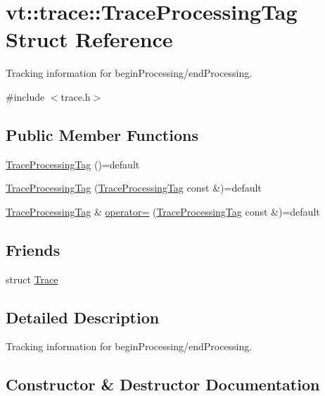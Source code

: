 \hypertarget{structvt_1_1trace_1_1_trace_processing_tag}{}\section{vt\+:\+:trace\+:\+:Trace\+Processing\+Tag Struct Reference}
\label{structvt_1_1trace_1_1_trace_processing_tag}


Tracking information for begin\+Processing/end\+Processing.  




{\ttfamily \#include $<$trace.\+h$>$}

\subsection*{Public Member Functions}
\begin{DoxyCompactItemize}
\item 
\hyperlink{structvt_1_1trace_1_1_trace_processing_tag_af06f6265d03791717242e1cec769dd84}{Trace\+Processing\+Tag} ()=default
\item 
\hyperlink{structvt_1_1trace_1_1_trace_processing_tag_a332019e755f6265ab0a74626322c590f}{Trace\+Processing\+Tag} (\hyperlink{structvt_1_1trace_1_1_trace_processing_tag}{Trace\+Processing\+Tag} const \&)=default
\item 
\hyperlink{structvt_1_1trace_1_1_trace_processing_tag}{Trace\+Processing\+Tag} \& \hyperlink{structvt_1_1trace_1_1_trace_processing_tag_a56727ddff7dce03576f3ed117235b327}{operator=} (\hyperlink{structvt_1_1trace_1_1_trace_processing_tag}{Trace\+Processing\+Tag} const \&)=default
\end{DoxyCompactItemize}
\subsection*{Friends}
\begin{DoxyCompactItemize}
\item 
struct \hyperlink{structvt_1_1trace_1_1_trace_processing_tag_a2e6db6037effb09584d7eba75b16dec4}{Trace}
\end{DoxyCompactItemize}


\subsection{Detailed Description}
Tracking information for begin\+Processing/end\+Processing. 

\subsection{Constructor \& Destructor Documentation}
\mbox{\label{structvt_1_1trace_1_1_trace_processing_tag_af06f6265d03791717242e1cec769dd84}} 
